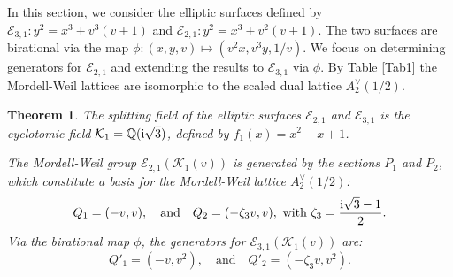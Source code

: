 \documentclass[11pt]{amsart}
\newtheorem{thm}{Theorem}[section]
\numberwithin{equation}{section}
\numberwithin{table}{section}
\newcommand\<{\langle}
\begin{document}
In this section, we consider the elliptic surfaces defined by $\mathcal{E}_{3,1}: y^2 = x^3 + v^3(v+1)$ and $\mathcal{E}_{2,1}: y^2 = x^3 + v^2(v+1)$. 
The two surfaces are birational via the map $\phi: (x, y, v) \mapsto (v^2 x, v^3 y, 1/v)$. We focus on determining generators for $\mathcal{E}_{2,1}$ and extending the results to $\mathcal{E}_{3,1}$ via $\phi$. By Table \ref{Tab1} the Mordell-Weil lattices are isomorphic to the scaled dual lattice $A_2^\vee(1/2)$.

\begin{thm} \label{main7}
	The splitting field of the elliptic surfaces $\mathcal{E}_{2,1}$ and $\mathcal{E}_{3,1}$ is the cyclotomic field $\mathcal{K}_{1} = \mathbb{Q}({\rm{i}} \sqrt{3})$, defined by $f_1(x)=x^2-x+1$.
	 
	The Mordell-Weil group $\mathcal{E}_{2,1}(\mathcal{K}_{1}(v))$ is generated by the sections $P_1$ and $P_2$, which constitute a basis for the Mordell-Weil lattice $A_2^\vee(1/2)$:
	\begin{equation}
		\label{Eq1}
		Q_1=(-v, v), \quad \text{and} \quad
		Q_2 = (-\zeta_3 v, v), \ \text{with } \zeta_3=\frac{{\rm{i}} \sqrt{3}-1}{2}.
	\end{equation}
	Via the birational map $\phi$, the generators for $\mathcal{E}_{3,1}(\mathcal{K}_{1}(v))$ are:
	\begin{equation} 	\label{Eq1-2}
		Q'_1=(-v, v^2), \quad \text{and} \quad
		Q'_2 = (-\zeta_3 v, v^2).
	\end{equation}	
\end{thm}
\end{document}
